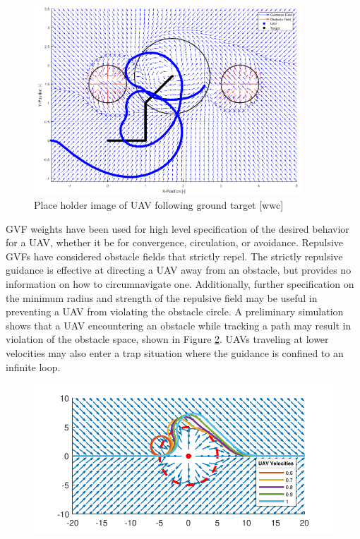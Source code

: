 \documentclass[numbered,pdftex]{ohio-etd}
\begin{document}
\begin{figure}[h]
	\centering
	\includegraphics[width=10cm]{PaperFigures/gvfMovingTarget}
	\caption{Place holder image of UAV following ground target [wwc]}
	\label{fig:gvfMovingTarget}
\end{figure}


GVF weights have been used for high level specification of the desired behavior for a UAV, whether it be for convergence, circulation, or avoidance. Repulsive GVFs have considered obstacle fields that strictly repel. The strictly repulsive guidance is effective at directing a UAV away from an obstacle, but provides no information on how to circumnavigate one. Additionally, further specification on the minimum radius and strength of the repulsive field may be useful in preventing a UAV from violating the obstacle circle. A preliminary simulation shows that a UAV encountering an obstacle while tracking a path may result in violation of the obstacle space, shown in Figure \ref{fig:singleobstacle}. UAVs traveling at lower velocities
 may also enter a trap situation where the guidance is confined to an infinite loop.
 \pagebreak

\begin{figure}[h]
	\centering
	\includegraphics[width=12cm]{PaperFigures/singleObstacle}
	\caption{}
	\label{fig:singleobstacle}
\end{figure}
\end{document}

